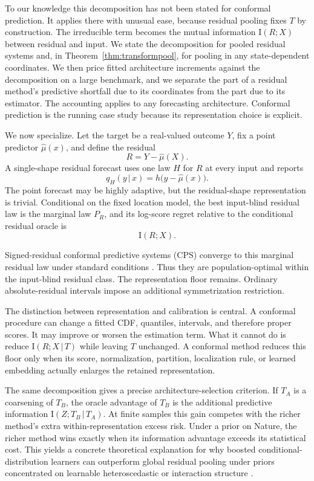 \documentclass[11pt]{article}
\theoremstyle{remark}
\newcommand{\I}{\mathrm{I}}
\newcommand{\given}{\,|\,}
\begin{document}
To our knowledge this decomposition has not been stated for conformal prediction. It applies
there with unusual ease, because residual pooling fixes $T$ by construction. The irreducible
term becomes the mutual information $\I(R;X)$ between residual and input. We state the decomposition for pooled residual systems and, in
Theorem~\ref{thm:transformpool}, for pooling in any state-dependent coordinates. We then
price fitted architecture increments against the decomposition on a large benchmark, and we
separate the part of a residual method's predictive shortfall due to its coordinates from the
part due to its estimator. The accounting applies to any forecasting architecture. Conformal
prediction is the running case study because its representation choice is explicit.

We now specialize. Let the target be a real-valued outcome $Y$, fix a point predictor
$\hat\mu(x)$, and define the residual
\[
R=Y-\hat\mu(X).
\]
A single-shape residual forecast uses one law $H$ for $R$ at every input and reports
\[
q_H(y\given x)=h\big(y-\hat\mu(x)\big).
\]
The point forecast may be highly adaptive, but the residual-shape representation is trivial.
Conditional on the fixed location model, the best input-blind residual law is the marginal law
$P_R$, and its log-score regret relative to the conditional residual oracle is
\[
\I(R;X).
\]

Signed-residual conformal predictive systems (CPS) converge to this marginal residual law under
standard conditions \citep{vovk2019nonparametric}. Thus they are population-optimal within
the input-blind residual class. The representation floor remains. Ordinary absolute-residual
intervals impose an additional symmetrization restriction.

The distinction between representation and calibration is central. A conformal procedure can
change a fitted CDF, quantiles, intervals, and therefore proper scores. It may improve or worsen
the estimation term. What it cannot do is reduce $\I(R;X\given T)$ while leaving $T$ unchanged. A
conformal method reduces this floor only when its score, normalization, partition, localization
rule, or learned embedding actually enlarges the retained representation.

The same decomposition gives a precise architecture-selection criterion. If $T_A$ is a coarsening
of $T_B$, the oracle advantage of $T_B$ is the additional predictive information
$\I(Z;T_B\given T_A)$. At finite samples this gain competes with the richer method's extra
within-representation excess risk. Under a prior on Nature, the richer method wins exactly when its information
advantage exceeds its statistical cost. This yields a concrete theoretical explanation for why
boosted conditional-distribution learners can outperform global residual pooling under priors
concentrated on learnable heteroscedastic or interaction structure
\citep{friedman2001greedy,chen2016xgboost,duan2020ngboost}.
\end{document}
